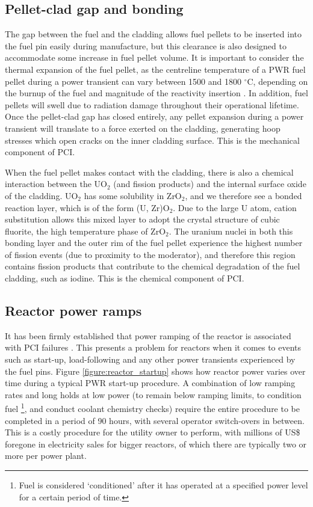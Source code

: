 \subsection{Pellet-clad gap and bonding}

The gap between the fuel and the cladding allows fuel pellets to be inserted into the fuel pin easily during manufacture, but this clearance is also designed to accommodate some increase in fuel pellet volume. It is important to consider the thermal expansion of the fuel pellet, as the centreline temperature of a PWR fuel pellet during a power transient can vary between 1500 and 1800 $^{\circ}$C, depending on the burnup of the fuel and magnitude of the reactivity insertion \cite{Bagger1994}. In addition, fuel pellets will swell due to radiation damage throughout their operational lifetime. Once the pellet-clad gap has closed entirely, any pellet expansion during a power transient will translate to a force exerted on the cladding, generating hoop stresses which open cracks on the inner cladding surface. This is the mechanical component of PCI.

When the fuel pellet makes contact with the cladding, there is also a chemical interaction between the UO$_{2}$ (and fission products) and the internal surface oxide of the cladding. UO$_{2}$ has some solubility in ZrO$_{2}$, and we therefore see a bonded reaction layer, which is of the form (U, Zr)O$_{2}$.  Due to the large U atom, cation substitution allows this mixed layer to adopt the crystal structure of cubic fluorite, the high temperature phase of ZrO$_{2}$. The uranium nuclei in both this bonding layer and the outer rim of the fuel pellet experience the highest number of fission events (due to proximity to the moderator), and therefore this region contains fission products that contribute to the chemical degradation of the fuel cladding, such as iodine. This is the chemical component of PCI.

\subsection{Reactor power ramps}

It has been firmly established that power ramping of the reactor is associated with PCI failures \cite{penn1977candu, MacDonald1979, Hardy1977198, Knaab1987}. This presents a problem for reactors when it comes to events such as start-up, load-following and any other power transients experienced by the fuel pins. Figure \ref{figure:reactor_startup} shows how reactor power varies over time during a typical PWR start-up procedure. A combination of low ramping rates and long holds at low power (to remain below ramping limits, to condition fuel \cite{billaux2005pellet} \footnote{Fuel is considered `conditioned' after it has operated at a specified power level for a certain period of time.}, and conduct coolant chemistry checks) require the entire procedure to be completed in a period of 90 hours, with several operator switch-overs in between. This is a costly procedure for the utility owner to perform, with millions of US\$ foregone in electricity sales for bigger reactors, of which there are typically two or more per power plant. 

